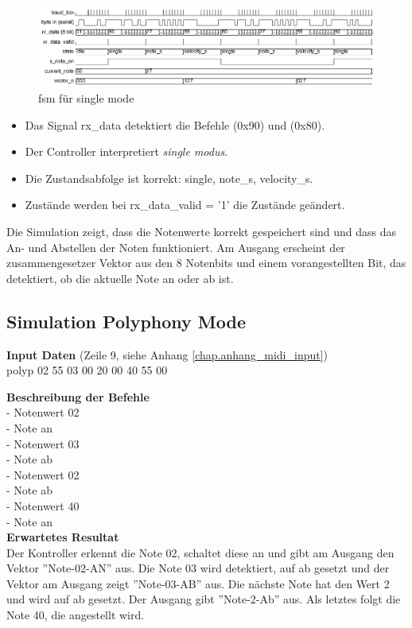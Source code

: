 \newpage

\begin{figure}[H]
	\centering
	\includegraphics[width=1\textwidth]{images/midi_control/wave_single.png}
	\caption{fsm für single mode}
	\label{fig.midicontrol_singlet}
\end{figure}

\begin{itemize}
	\item Das Signal rx\_data detektiert die Befehle (0x90) und (0x80).
	\item Der Controller interpretiert  \textit{single modus}. 
	\item Die Zustandsabfolge ist korrekt: single, note\_s, velocity\_s.
	\item Zustände werden bei rx\_data\_valid = '1' die Zustände geändert.
\end{itemize}

Die Simulation zeigt, dass die Notenwerte korrekt gespeichert sind und dass das An- und Abstellen der Noten funktioniert. Am Ausgang erscheint der zusammengesetzer Vektor aus den 8 Notenbits und einem vorangestellten Bit, das detektiert, ob die aktuelle Note an oder ab ist. 



\subsection{Simulation Polyphony Mode}
\textbf{Input Daten} (Zeile 9, siehe Anhang \ref{chap.anhang_midi_input})\\
polyp 02 55 03 00 20 00 40 55 00

\textbf{Beschreibung der Befehle}\\
- Notenwert 02\\
- Note an\\
- Notenwert 03\\
- Note ab\\
- Notenwert 02\\
- Note ab\\
- Notenwert 40\\
- Note an\\

\textbf{Erwartetes Resultat}\\
Der Kontroller erkennt die Note 02, schaltet diese an und gibt am Ausgang den Vektor ''Note-02-AN'' aus. Die Note 03 wird detektiert, auf ab gesetzt und der Vektor am Ausgang zeigt ''Note-03-AB'' aus. Die nächste Note hat den Wert 2 und wird auf ab gesetzt. Der Ausgang gibt ''Note-2-Ab'' aus. Als letztes folgt die Note 40, die angestellt wird.\\

